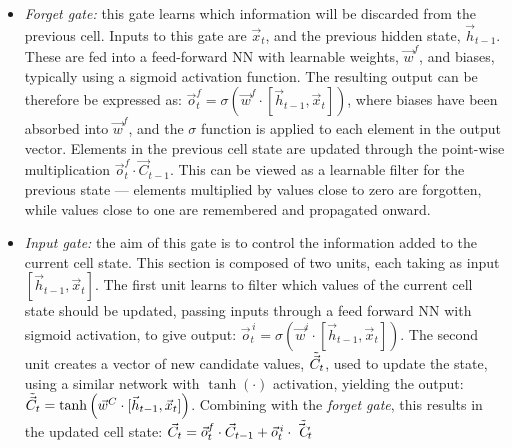 \begin{itemize}
    \item \textit{Forget gate:} this gate learns which information will be discarded from the previous cell. Inputs to this gate are $\vec{x}_{t}$, and the previous hidden state, $\vec{h}_{t-1}$. These are fed into a feed-forward NN with learnable weights, $\vec{w}^{f}$, and biases, typically using a sigmoid activation function. The resulting output can be therefore be expressed as: $\vec{o}^{f}_{t}=\sigma\left(\vec{w}^{f}\cdot[\vec{h}_{t-1},\vec{x}_{t}]\right)$, where biases have been absorbed into $\vec{w}^{f}$, and the $\sigma$ function is applied to each element in the output vector. Elements in the previous cell state are updated through the point-wise multiplication $\vec{o}^{f}_{t} \cdot \vec{C}_{t-1}$. This can be viewed as a learnable filter for the previous state --- elements multiplied by values close to zero are forgotten, while values close to one are remembered and propagated onward.
    \item \textit{Input gate:} the aim of this gate is to control the information added to the current cell state. This section is composed of two units, each taking as input $[\vec{h}_{t-1},\vec{x}_{t}]$. The first unit learns to filter which values of the current cell state should be updated, passing inputs through a feed forward NN with sigmoid activation, to give output: $\vec{o}^{\,i}_{t}=\sigma\left(\vec{w}^{i}\cdot[\vec{h}_{t-1},\vec{x}_{t}]\right)$. The second unit creates a vector of new candidate values, $\Tilde{\vec{C}}_{t}$, used to update the state, using a similar network with $\tanh(\cdot)$ activation, yielding the output: $\Tilde{\vec{C}}_{t}=\tanh\left(\vec{w}^{C}\cdot[\vec{h}_{t-1},\vec{x}_{t}]\right)$. Combining with the \textit{forget gate}, this results in the updated cell state: $\vec{C}_{t} = \vec{o}^{f}_{t}\cdot \vec{C}_{t-1} + \vec{o}^{\,i}_{t}\cdot\Tilde{\vec{C}_{t}}$

\end{itemize}
